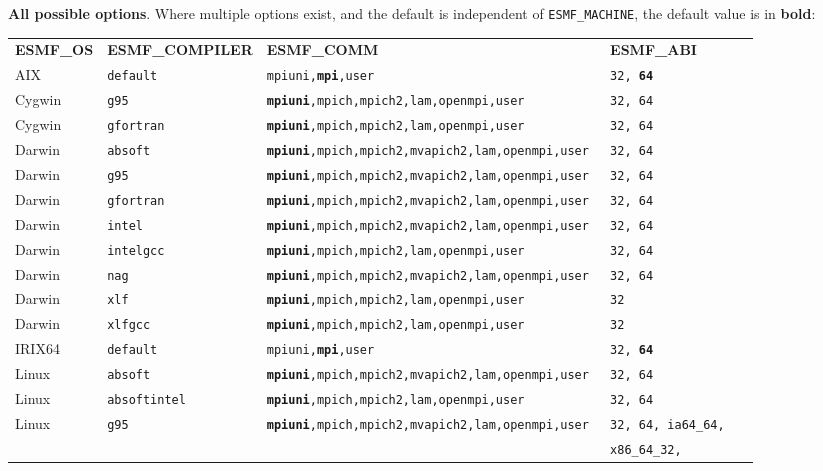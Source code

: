 {\bf All possible options}. Where multiple options exist, and the default is independent
of {\tt ESMF\_MACHINE}, the default value is in {\bf bold}:

\vspace{1ex}


\begin{longtable}{lllll}
  {\bfseries\footnotesize ESMF\_OS} &{\bfseries\footnotesize ESMF\_COMPILER} & {\bfseries\footnotesize ESMF\_COMM} & {\bfseries\footnotesize ESMF\_ABI} \\

AIX     &\tt default     &\tt mpiuni,{\bf mpi},user      &\tt 32, {\bf 64} \\
Cygwin  &\tt g95         &\tt {\bf mpiuni},mpich,mpich2,lam,openmpi,user &\tt 32, 64 \\
Cygwin  &\tt gfortran    &\tt {\bf mpiuni},mpich,mpich2,lam,openmpi,user &\tt 32, 64 \\
Darwin  &\tt absoft      &\tt {\bf mpiuni},mpich,mpich2,mvapich2,lam,openmpi,user &\tt 32, 64 \\
Darwin  &\tt g95         &\tt {\bf mpiuni},mpich,mpich2,mvapich2,lam,openmpi,user &\tt 32, 64 \\
Darwin  &\tt gfortran    &\tt {\bf mpiuni},mpich,mpich2,mvapich2,lam,openmpi,user &\tt 32, 64 \\
Darwin  &\tt intel       &\tt {\bf mpiuni},mpich,mpich2,mvapich2,lam,openmpi,user &\tt 32, 64 \\
Darwin  &\tt intelgcc    &\tt {\bf mpiuni},mpich,mpich2,lam,openmpi,user &\tt 32, 64 \\
Darwin  &\tt nag         &\tt {\bf mpiuni},mpich,mpich2,mvapich2,lam,openmpi,user &\tt 32, 64 \\
Darwin  &\tt xlf         &\tt {\bf mpiuni},mpich,mpich2,lam,openmpi,user &\tt 32 \\
Darwin  &\tt xlfgcc      &\tt {\bf mpiuni},mpich,mpich2,lam,openmpi,user &\tt 32 \\
IRIX64  &\tt default     &\tt mpiuni,{\bf mpi},user     &\tt 32, {\bf 64} \\
Linux   &\tt absoft      &\tt {\bf mpiuni},mpich,mpich2,mvapich2,lam,openmpi,user &\tt 32, 64 \\
Linux   &\tt absoftintel &\tt {\bf mpiuni},mpich,mpich2,lam,openmpi,user &\tt 32, 64  \\
Linux   &\tt g95         &\tt {\bf mpiuni},mpich,mpich2,mvapich2,lam,openmpi,user &\tt 32, 64, ia64\_64, \\
        &                &                              &\tt x86\_64\_32, \\

\end{longtable}
